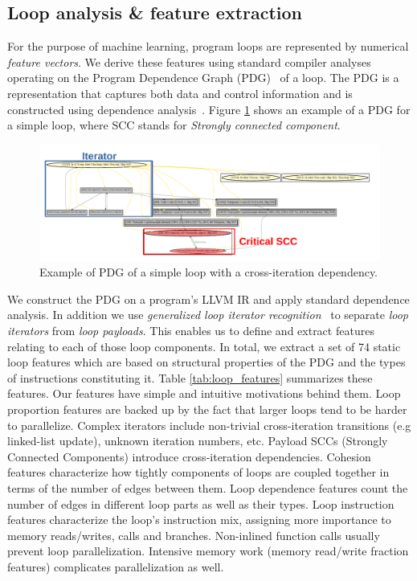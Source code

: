 \subsection{Loop analysis \& feature extraction}
\label{loop_analysis_and_features}
\quad For the purpose of machine learning, program loops are represented by numerical \textit{feature vectors}. We derive these features using standard compiler analyses operating on the Program Dependence Graph (PDG)~\cite{Ferrante:1987:PDG:24039.24041} of a loop. The PDG is a representation that captures both data and control information and is constructed using dependence analysis~\cite{Kennedy:2001:OCM:502981}. Figure \ref{fig:pdg} shows an example of a PDG for a simple loop, where SCC stands for \emph{Strongly connected component}.
\begin{figure}[ht]
\includegraphics[width=1.0\textwidth]{images/pdg_example.pdf}
\caption{Example of PDG of a simple loop with a cross-iteration dependency.}
\label{fig:pdg}
\end{figure}
We construct the PDG on a program's LLVM IR and apply standard dependence analysis. In addition we use \textit{generalized loop iterator recognition}~\cite{Manilov:2018:GPI:3178372.3179511} to separate \textit{loop iterators} from \textit{loop payloads}. This enables us to define and extract features relating to each of those loop components. In total, we extract a set of 74 static loop features which are based on structural properties of the PDG and the types of instructions constituting it. Table \ref{tab:loop_features} summarizes these features.\newline\null
\quad Our features have simple and intuitive motivations behind them. Loop proportion features are backed up by the fact that larger loops tend to be harder to parallelize. Complex iterators include non-trivial cross-iteration transitions (e.g linked-list update), unknown iteration numbers, etc. Payload SCCs (Strongly Connected Components) introduce cross-iteration dependencies. Cohesion features characterize how tightly components of loops are coupled together in terms of the number of edges between them. Loop dependence features count the number of edges in different loop parts as well as their types. Loop instruction features characterize the loop's instruction mix, assigning more importance to memory reads/writes, calls and branches. Non-inlined function calls usually prevent loop parallelization. Intensive memory work (memory read/write fraction features) complicates parallelization as well.
